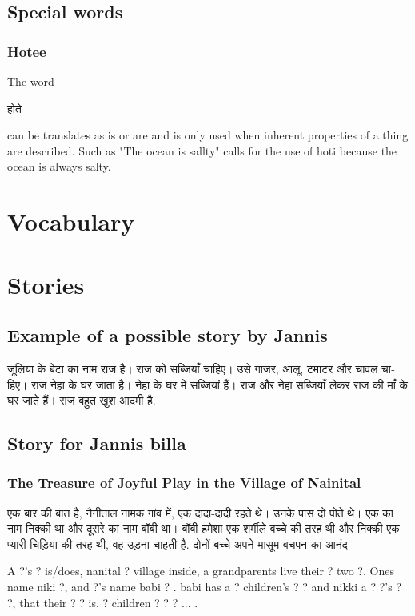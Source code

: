 \documentclass[12pt]{scrartcl}
\begin{document}
\subsection{Special words}
\subsubsection{Hotee}
	The word \begin{hindi}होते   \end{hindi} can be translates as is or are and is only used when inherent properties of a thing are described. Such as "The ocean is sallty" calls for the use of hoti because the ocean is always salty.


\newpage 
\section{Vocabulary}


\section{Stories}
\subsection{Example of a possible story by Jannis}



\begin{hindi}
जूलिया के बेटा का नाम राज है।
राज को सब्जियाँ चाहिए।
उसे गाजर, आलू, टमाटर और चावल चाहिए।
राज नेहा के घर जाता है।
नेहा के घर में सब्जियां हैं।
राज और नेहा सब्जियाँ लेकर राज की माँ के घर जाते हैं।
राज बहुत खुश आदमी है.
\end{hindi}

\subsection{Story for Jannis billa}
\subsubsection{The Treasure of Joyful Play in the Village of Nainital}


\begin{hindi}
एक बार की बात है, नैनीताल नामक गांव में, एक दादा-दादी रहते थे। उनके पास दो पोते थे। एक का नाम निक्की था और दूसरे का नाम बॉबी था। बॉबी हमेशा एक शर्मीले बच्चे की तरह थी और निक्की एक प्यारी चिड़िया की तरह थी, वह उड़ना चाहती है. दोनों बच्चे अपने मासूम बचपन का आनंद \end{hindi}

A ?'s ? is/does, nanital ? village inside, a grandparents live their ? two ?. Ones name niki ?, and ?'s name babi ? . babi has a ? children's ? ? and nikki a ? ?'s ? ?, that their ? ? is. ? children ? ? ? ... . 

\end{document}
